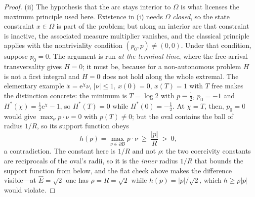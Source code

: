 \documentclass[12pt]{iopart}
\newcommand{\Ehat}{\hat E}
\theoremstyle{plain}
\theoremstyle{definition}
\theoremstyle{plain}
\theoremstyle{remark}
\begin{document}
\begin{proof}
(ii) The hypothesis that the arc stays interior to $\Omega$ is what licenses the
maximum principle used here. Existence in (i) needs $\Omega$ \emph{closed}, so the state
constraint $x\in\Omega$ is part of the problem; but along an interior arc that constraint
is inactive, the associated measure multiplier vanishes, and the classical
principle~\cite{Pontryagin,Liberzon} applies with the nontriviality condition
$(p_0,p)\neq(0,0)$. Under that condition, suppose $p_0=0$. The argument is run \emph{at the terminal
time}, where the free-arrival transversality gives $H=0$; it must be, because for a
non-autonomous problem $H$ is not a first integral and $H=0$ does not hold along the
whole extremal. The elementary example $\dot x=\mathrm e^{\chi}\nu$, $|\nu|\le1$,
$x(0)=0$, $x(T)=1$ with $T$ free makes the distinction concrete: the minimum is
$T=\log2$ with $p\equiv\tfrac12$, $p_0=-1$ and $H^\ast(\chi)=\tfrac12\mathrm
e^{\chi}-1$, so $H^\ast(T)=0$ while $H^\ast(0)=-\tfrac12$. At $\chi=T$, then, $p_0=0$
would give $\max_\nu p\cdot\nu=0$ with $p(T)\neq0$; but the oval contains the ball of
radius $1/R$, so its support function obeys
\begin{equation}
    h(p)=\max_{\nu\in\partial B}p\cdot\nu\ \ge\ \frac{|p|}{R}\ >\ 0 ,
    \label{eq:support-bound}
\end{equation}
a contradiction. The constant here is $1/R$ and not $\rho$: the two coercivity
constants are reciprocals of the oval's radii, so it is the \emph{inner} radius
$1/R$ that bounds the support function from below, and the flat check above makes
the difference visible---at $\Ehat=\sqrt2$ one has $\rho=R=\sqrt2$ while
$h(p)=|p|/\sqrt2$, which $h\ge\rho|p|$ would violate.


\end{proof}
\end{document}

